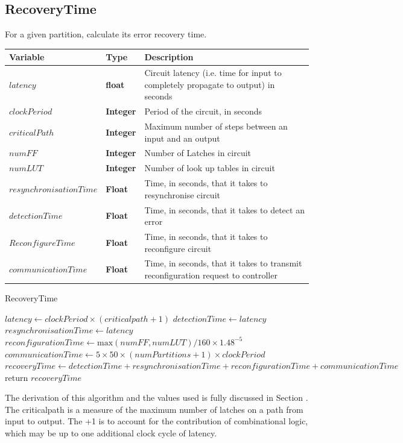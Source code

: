 \documentclass[12pt,final,oneside]{article} %
\begin{document}
\newpage
\subsection{RecoveryTime}
For a given partition, calculate its error recovery time.
\begin{algorithm}
   \begin{center}
        \begin{tabularx}{\linewidth}{llX}
        \toprule
        Variable & Type & Description\\
        \midrule
        $latency$ &\bf  float & Circuit latency (i.e. time for input to completely propagate to output) in seconds\\
        $clockPeriod$ &\bf  Integer & Period of the circuit, in seconds\\
        $criticalPath$ &\bf  Integer & Maximum number of steps between an input and an output\\
        $numFF$ &\bf  Integer & Number of Latches in circuit\\
        $numLUT$ &\bf  Integer & Number of look up tables in circuit\\
        $resynchronisationTime$ &\bf  Float & Time, in seconds, that it takes to resynchronise circuit\\
        $detectionTime$ &\bf  Float & Time, in seconds, that it takes to detect an error\\
        $ReconfigureTime$ &\bf  Float & Time, in seconds, that it takes to reconfigure circuit\\
        $communicationTime$ &\bf  Float & Time, in seconds, that it takes to transmit reconfiguration request to controller\\
        \bottomrule
        \end{tabularx}
    \end{center}
   \caption{RecoveryTime}\label{recoverytime}
   \begin{algorithmic}[1]
            \State $latency \gets clockPeriod\times{}(criticalpath+1)$
            \State $detectionTime \gets latency$
            \State $resynchronisationTime \gets latency$
            \State $reconfigurationTime \gets \mbox{max}(numFF, numLUT)/160\times 1.48^{-5}$
            \State $communicationTime \gets 5\times 50\times(numPartitions+1)\times clockPeriod$
            \State $recoveryTime \gets detectionTime+resynchronisationTime+reconfigurationTime+communicationTime$
            \State return $recoveryTime$
         \EndProcedure
   \end{algorithmic}
\end{algorithm}
The derivation of this algorithm and the values used is fully discussed in Section . The criticalpath is a measure of the maximum number of latches on a path from input to output. The +1 is to account for the contribution of combinational logic, which may be up to one additional clock cycle of latency.
\end{document}
